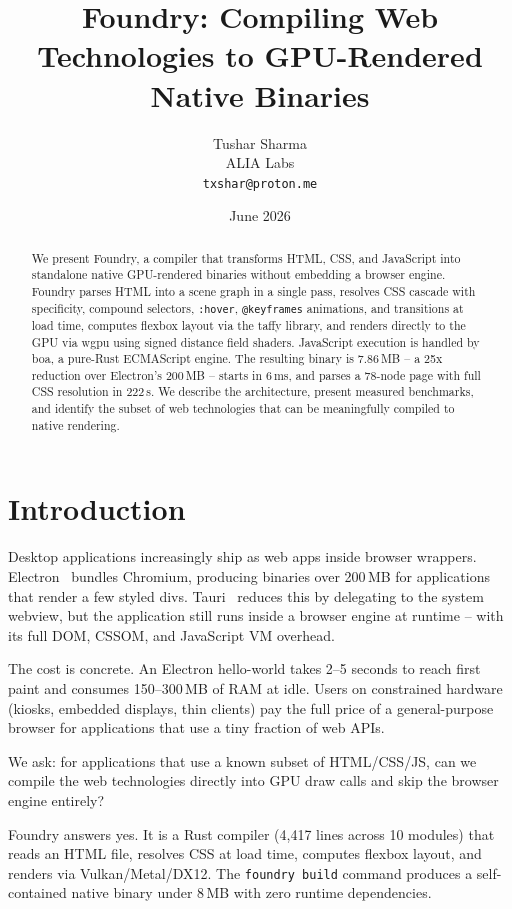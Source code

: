 \documentclass[11pt,twocolumn]{article}
\title{Foundry: Compiling Web Technologies to GPU-Rendered Native Binaries}
\author{Tushar Sharma \\ ALIA Labs \\ \texttt{txshar@proton.me}}
\date{June 2026}
\begin{document}
\maketitle

\begin{abstract}
We present Foundry, a compiler that transforms HTML, CSS, and JavaScript into standalone native GPU-rendered binaries without embedding a browser engine. Foundry parses HTML into a scene graph in a single pass, resolves CSS cascade with specificity, compound selectors, \texttt{:hover}, \texttt{@keyframes} animations, and transitions at load time, computes flexbox layout via the taffy library, and renders directly to the GPU via wgpu using signed distance field shaders. JavaScript execution is handled by boa, a pure-Rust ECMAScript engine. The resulting binary is 7.86\,MB -- a 25x reduction over Electron's 200\,MB -- starts in 6\,ms, and parses a 78-node page with full CSS resolution in 222\,\textmu s. We describe the architecture, present measured benchmarks, and identify the subset of web technologies that can be meaningfully compiled to native rendering.
\end{abstract}

\section{Introduction}

Desktop applications increasingly ship as web apps inside browser wrappers. Electron~\cite{electron} bundles Chromium, producing binaries over 200\,MB for applications that render a few styled divs. Tauri~\cite{tauri} reduces this by delegating to the system webview, but the application still runs inside a browser engine at runtime -- with its full DOM, CSSOM, and JavaScript VM overhead.

The cost is concrete. An Electron hello-world takes 2--5 seconds to reach first paint and consumes 150--300\,MB of RAM at idle. Users on constrained hardware (kiosks, embedded displays, thin clients) pay the full price of a general-purpose browser for applications that use a tiny fraction of web APIs.

We ask: for applications that use a known subset of HTML/CSS/JS, can we compile the web technologies directly into GPU draw calls and skip the browser engine entirely?

Foundry answers yes. It is a Rust compiler (4,417 lines across 10 modules) that reads an HTML file, resolves CSS at load time, computes flexbox layout, and renders via Vulkan/Metal/DX12. The \texttt{foundry build} command produces a self-contained native binary under 8\,MB with zero runtime dependencies.
\end{document}

